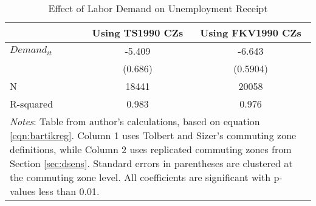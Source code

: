 \begin{table}[tbh]\centering
\caption{Effect of Labor Demand on Unemployment Receipt \label{tab:bartik_results}}
\begin{tabular}{lcc}
\hline\hline
       & Using TS1990 CZs & Using FKV1990 CZs \\
       	
       \hline
$Demand_{it}$ & -5.409 & -6.643  \\
              & (0.686) & (0.5904) \\
\hline
N			&	18441	&	20058	\\
R-squared 	&	0.983	&	0.976	\\

\hline
\multicolumn{3}{p{4in}}{\footnotesize \textit{Notes}: Table from author's calculations, based on equation \ref{eqn:bartikreg}. Column 1 uses Tolbert and Sizer's commuting zone definitions, while Column 2 uses replicated commuting zones from Section \ref{sec:dsens}. Standard errors in parentheses are clustered at the commuting zone level. All coefficients are significant with p-values less than 0.01.}\\
\end{tabular}
\end{table}